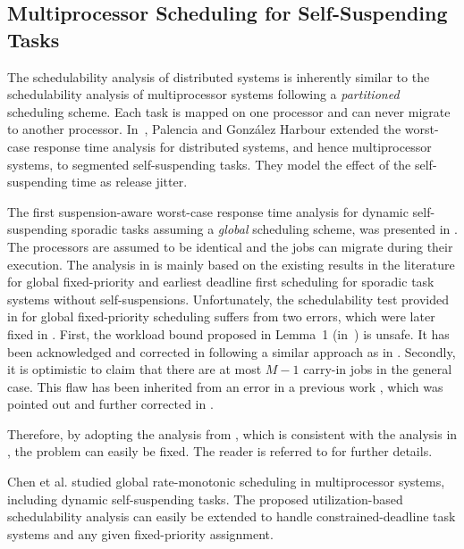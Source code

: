 \subsection{Multiprocessor Scheduling for Self-Suspending Tasks}
\label{sec:multiprocessor-HRT}
  
The schedulability analysis of distributed systems is inherently similar to the schedulability analysis of multiprocessor systems following a 
\emph{partitioned} scheduling scheme. Each task is mapped on one processor and can never migrate to another processor. In~\cite{PH:rtss98}, 
Palencia and Gonz\'alez Harbour extended the worst-case response time analysis for distributed systems, and hence multiprocessor systems, to segmented self-suspending tasks. They model the effect of the self-suspending time as release jitter.
  
The first suspension-aware worst-case response time analysis for dynamic self-suspending sporadic tasks assuming a \emph{global} scheduling scheme, was presented in \cite{DBLP:conf/ecrts/LiuA13}. 
The processors are assumed to be identical and the jobs can migrate during their execution. The analysis in \cite{DBLP:conf/ecrts/LiuA13} is mainly based on the existing results in the literature for global fixed-priority and earliest deadline first scheduling for sporadic task systems without self-suspensions. Unfortunately, the schedulability test provided in \cite{DBLP:conf/ecrts/LiuA13} for global fixed-priority scheduling suffers from two errors, which were later fixed in \cite{erratu-cong-anderson}. First, the workload bound proposed in Lemma~1 (in~\cite{DBLP:conf/ecrts/LiuA13}) is unsafe. It has been acknowledged and corrected in \cite{erratu-cong-anderson} following a similar approach as in \cite{baruah2007techniques}. 
Secondly, it is optimistic to claim that there are at most $M-1$ carry-in jobs in the general case. This flaw has been inherited from an error in a 
previous work \cite{DBLP:conf/rtss/GuanSYY09}, which was pointed out and further corrected in \cite{sun2014improving,DBLP:conf/rtns/HuangC15}. 

Therefore, by adopting the analysis from \cite{DBLP:conf/rtns/HuangC15}, which is consistent with the analysis in \cite{DBLP:conf/ecrts/LiuA13}, the problem can easily be fixed. The reader is referred to \cite{erratu-cong-anderson} for further details.
  
Chen et al. \cite{ChenHLRTSS2015} studied global rate-monotonic scheduling in multiprocessor systems, including dynamic self-suspending tasks. The proposed utilization-based schedulability analysis  can easily be extended to handle constrained-deadline task systems and any given fixed-priority assignment.
  
  




  
